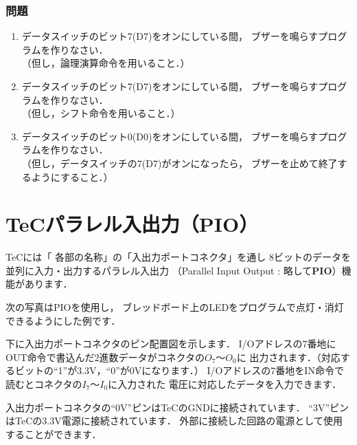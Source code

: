 \subsubsection{問題}
\begin{enumerate}
\item データスイッチのビット7(D7)をオンにしている間，
ブザーを鳴らすプログラムを作りなさい．\\
（但し，論理演算命令を用いること．）
\item データスイッチのビット7(D7)をオンにしている間，
ブザーを鳴らすプログラムを作りなさい．\\
（但し，シフト命令を用いること．）
\item データスイッチのビット0(D0)をオンにしている間，
ブザーを鳴らすプログラムを作りなさい．\\
（但し，データスイッチの7(D7)がオンになったら，
ブザーを止めて終了するようにすること．）
\end{enumerate}
\vfill

\newpage
\section{TeCパラレル入出力（PIO）}
\label{pio}

TeCには「 各部の名称」の「入出力ポートコネクタ」を通し
8ビットのデータを並列に入力・出力するパラレル入出力
（Parallel Input Output : 略して{\bf PIO}）機能があります．

次の写真はPIOを使用し，
ブレッドボード上のLEDをプログラムで点灯・消灯できるようにした例です．


\begin{center}
\end{center}

下に入出力ポートコネクタのピン配置図を示します．
I/Oアドレスの7番地にOUT命令で書込んだ2進数データがコネクタの$O_7$〜$O_0$に
出力されます．（対応するビットの``1''が3.3V，``0''が0Vになります．）
I/Oアドレスの7番地をIN命令で読むとコネクタの$I_7$〜$I_0$に入力された
電圧に対応したデータを入力できます．

入出力ポートコネクタの``0V''ピンはTeCのGNDに接続されています．
``3V''ピンはTeCの3.3V電源に接続されています．
外部に接続した回路の電源として使用することができます．

